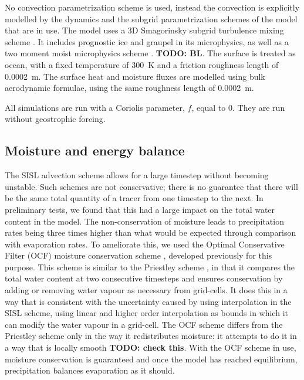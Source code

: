 \documentclass[11pt,a4paper]{article}
\newcommand\todo[1]{\textbf{TODO: #1}}
\begin{document}
No convection parametrization scheme is used, instead the convection is explicitly modelled by the dynamics and the subgrid parametrization schemes of the model that are in use. The model uses a 3D Smagorinsky subgrid turbulence mixing scheme \parencite{todocite}. It includes prognostic ice and graupel in its microphysics, as well as a two moment moist microphysics scheme \parencite{todocite}. \todo{BL}. The surface is treated as ocean, with a fixed temperature of \SI{300}{K} and a friction roughness length of \SI{0.0002}{m}. The surface heat and moisture fluxes are modelled using bulk aerodynamic formulae, using the same roughness length of \SI{0.0002}{m}.

All simulations are run with a Coriolis parameter, $f$, equal to 0. They are run without geostrophic forcing.

\subsection{Moisture and energy balance}

The SISL advection scheme allows for a large timestep without becoming unstable. Such schemes are not conservative; there is no guarantee that there will be the same total quantity of a tracer from one timestep to the next. In preliminary tests, we found that this had a large impact on the total water content in the model. The non-conservation of moisture leads to precipitation rates being three times higher than what would be expected through comparison with evaporation rates. To ameliorate this, we used the Optimal Conservative Filter (OCF) moisture conservation scheme \parencite{zerroukat2015monotonic}, developed previously for this purpose. This scheme is similar to the Priestley scheme \parencite{priestley1993quasi}, in that it compares the total water content at two consecutive timesteps and ensures conservation by adding or removing water vapour as necessary from grid-cells. It does this in a way that is consistent with the uncertainty caused by using interpolation in the SISL scheme, using linear and higher order interpolation as bounds in which it can modify the water vapour in a grid-cell. The OCF scheme differs from the Priestley scheme only in the way it redistributes moisture: it attempts to do it in a way that is locally smooth \todo{check this}. With the OCF scheme in use, moisture conservation is guaranteed and once the model has reached equilibrium, precipitation balances evaporation as it should.
\end{document}

